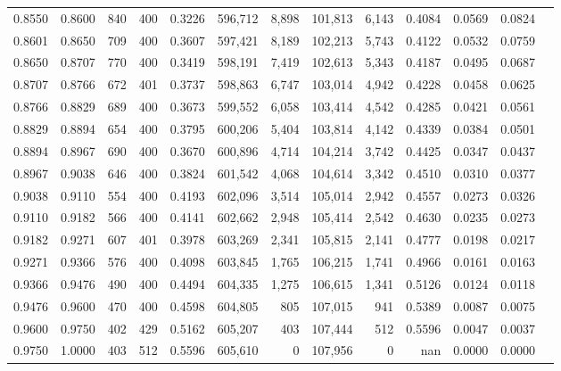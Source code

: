\begin{tabular}{rrrrrrrrrrrrr}
0.8550 & 0.8600 &   840 & 400 &                                     0.3226 & 596,712 &   8,898 & 101,813 &   6,143 & 0.4084 & 0.0569 & 0.0824 \\
0.8601 & 0.8650 &   709 & 400 &                                     0.3607 & 597,421 &   8,189 & 102,213 &   5,743 & 0.4122 & 0.0532 & 0.0759 \\
0.8650 & 0.8707 &   770 & 400 &                                     0.3419 & 598,191 &   7,419 & 102,613 &   5,343 & 0.4187 & 0.0495 & 0.0687 \\
0.8707 & 0.8766 &   672 & 401 &                                     0.3737 & 598,863 &   6,747 & 103,014 &   4,942 & 0.4228 & 0.0458 & 0.0625 \\
0.8766 & 0.8829 &   689 & 400 &                                     0.3673 & 599,552 &   6,058 & 103,414 &   4,542 & 0.4285 & 0.0421 & 0.0561 \\
0.8829 & 0.8894 &   654 & 400 &                                     0.3795 & 600,206 &   5,404 & 103,814 &   4,142 & 0.4339 & 0.0384 & 0.0501 \\
0.8894 & 0.8967 &   690 & 400 &                                     0.3670 & 600,896 &   4,714 & 104,214 &   3,742 & 0.4425 & 0.0347 & 0.0437 \\
0.8967 & 0.9038 &   646 & 400 &                                     0.3824 & 601,542 &   4,068 & 104,614 &   3,342 & 0.4510 & 0.0310 & 0.0377 \\
0.9038 & 0.9110 &   554 & 400 &                                     0.4193 & 602,096 &   3,514 & 105,014 &   2,942 & 0.4557 & 0.0273 & 0.0326 \\
0.9110 & 0.9182 &   566 & 400 &                                     0.4141 & 602,662 &   2,948 & 105,414 &   2,542 & 0.4630 & 0.0235 & 0.0273 \\
0.9182 & 0.9271 &   607 & 401 &                                     0.3978 & 603,269 &   2,341 & 105,815 &   2,141 & 0.4777 & 0.0198 & 0.0217 \\
0.9271 & 0.9366 &   576 & 400 &                                     0.4098 & 603,845 &   1,765 & 106,215 &   1,741 & 0.4966 & 0.0161 & 0.0163 \\
0.9366 & 0.9476 &   490 & 400 &                                     0.4494 & 604,335 &   1,275 & 106,615 &   1,341 & 0.5126 & 0.0124 & 0.0118 \\
0.9476 & 0.9600 &   470 & 400 &                                     0.4598 & 604,805 &     805 & 107,015 &     941 & 0.5389 & 0.0087 & 0.0075 \\
0.9600 & 0.9750 &   402 & 429 &                                     0.5162 & 605,207 &     403 & 107,444 &     512 & 0.5596 & 0.0047 & 0.0037 \\
0.9750 & 1.0000 &   403 & 512 &                                     0.5596 & 605,610 &       0 & 107,956 &       0 &    nan & 0.0000 & 0.0000 \\
\bottomrule
\end{tabular}
